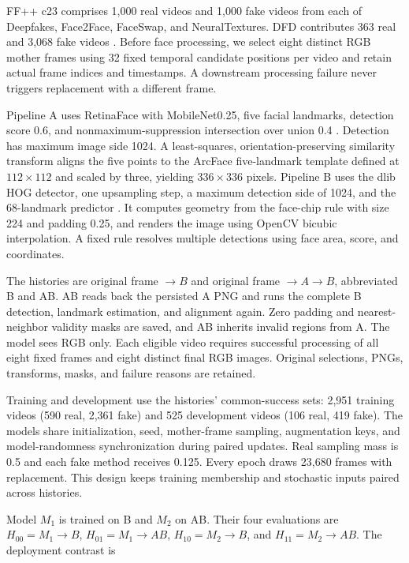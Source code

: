 \documentclass{ieeeaccess}
\begin{document}
FF++ c23 comprises 1,000 real videos and 1,000 fake videos from each of
Deepfakes, Face2Face, FaceSwap, and NeuralTextures. DFD contributes 363
real and 3,068 fake videos \citep{ffdata}. Before face processing, we
select eight distinct RGB mother frames using 32 fixed temporal
candidate positions per video and retain actual frame indices and
timestamps. A downstream processing failure never triggers replacement
with a different frame.

Pipeline A uses RetinaFace with MobileNet0.25, five facial landmarks,
detection score 0.6, and nonmaximum-suppression intersection over union
0.4 \citep{retinaface, retinaimplementation}. Detection has maximum
image side 1024. A least-squares, orientation-preserving similarity
transform aligns the five points to the ArcFace five-landmark template
defined at \(112\times112\) and scaled by three, yielding
\(336\times336\) pixels. Pipeline B uses the dlib HOG detector, one
upsampling step, a maximum detection side of 1024, and the 68-landmark
predictor \citep{dlib}. It computes geometry from the face-chip rule
with size 224 and padding 0.25, and renders the image using OpenCV
bicubic interpolation. A fixed rule resolves multiple detections using
face area, score, and coordinates.

The histories are original frame \(\rightarrow B\) and original frame
\(\rightarrow A\rightarrow B\), abbreviated B and AB. AB reads back the
persisted A PNG and runs the complete B detection, landmark estimation,
and alignment again. Zero padding and nearest-neighbor validity masks
are saved, and AB inherits invalid regions from A. The model sees RGB
only. Each eligible video requires successful processing of all eight
fixed frames and eight distinct final RGB images. Original selections,
PNGs, transforms, masks, and failure reasons are retained.

Training and development use the histories' common-success sets: 2,951
training videos (590 real, 2,361 fake) and 525 development videos (106
real, 419 fake). The models share initialization, seed, mother-frame
sampling, augmentation keys, and model-randomness synchronization during
paired updates. Real sampling mass is 0.5 and each fake method receives
0.125. Every epoch draws 23,680 frames with replacement. This design
keeps training membership and stochastic inputs paired across histories.

Model \(M_1\) is trained on B and \(M_2\) on AB. Their four evaluations
are \(H_{00}=M_1\rightarrow B\), \(H_{01}=M_1\rightarrow AB\),
\(H_{10}=M_2\rightarrow B\), and \(H_{11}=M_2\rightarrow AB\). The
deployment contrast is
\end{document}
